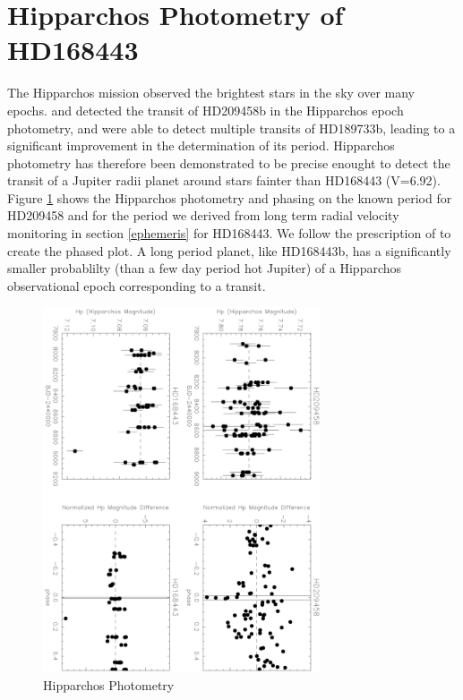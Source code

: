\documentclass[12pt,preprint]{emulateapj}
\begin{document}

\section{Hipparchos Photometry of HD168443}
The Hipparchos mission observed the brightest stars in the sky over many epochs. \citet{Robichon00} and \citet{Castellano00} detected the transit of HD209458b in the Hipparchos epoch photometry, and \citet{Hebrard06} were able to detect multiple transits of HD189733b, leading to a significant improvement in the determination of its period.  Hipparchos photometry has therefore been demonstrated to be precise enought to detect the transit of a Jupiter radii planet around stars fainter than HD168443 (V=6.92).  Figure \ref{fig:hip} shows the Hipparchos photometry and phasing on the known period for HD209458 and for the period we derived from long term radial velocity monitoring in section \ref{ephemeris} for HD168443. We follow the prescription of \citet{Robichon00} to create the phased plot. A long period planet, like HD168443b, has a significantly smaller probablilty (than a few day period hot Jupiter) of a Hipparchos observational epoch corresponding to a transit. 

\begin{figure}[h]
  \includegraphics[angle=90,width=8.2cm]{HipparcosCheck}
  \caption{Hipparchos Photometry}
  \label{fig:hip}
\end{figure}


\end{document}
